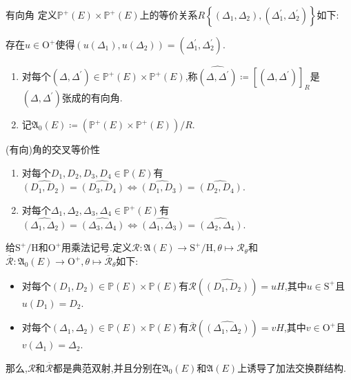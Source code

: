\begin{definition}{有向角}{}
	定义$\mathbb{P}^{+}\left(E\right)\times\mathbb{P}^{+}\left(E\right)$上的等价关系$R\left\{\left(\Delta_{1},\Delta_{2}\right),\left(\Delta_{1}^{\prime},\Delta_{2}^{\prime}\right)\right\}$如下:
	\begin{center}
		存在$u\in\mathrm{O}^{+}$使得$\left(u\left(\Delta_{1}\right),u\left(\Delta_{2}\right)\right)=\left(\Delta_{1}^{\prime},\Delta_{2}^{\prime}\right)$.
	\end{center}
	\begin{enumerate}
		\item 对每个$\left(\Delta,\Delta^{\prime}\right)\in\mathbb{P}^{+}\left(E\right)\times\mathbb{P}^{+}\left(E\right)$,称$\widehat{\left(\Delta,\Delta^{\prime}\right)}\coloneq\left[\left(\Delta,\Delta^{\prime}\right)\right]_{R}$是$\left(\Delta,\Delta^{\prime}\right)$张成的有向角.
		\item 记$\mathfrak{A}_{0}\left(E\right)\coloneq\left(\mathbb{P}^{+}\left(E\right)\times\mathbb{P}^{+}\left(E\right)\right)/R$.
	\end{enumerate}
\end{definition}

\begin{proposition}{(有向)角的交叉等价性}{}
	\begin{enumerate}
		\item 对每个$D_{1},D_{2},D_{3},D_{4}\in\mathbb{P}\left(E\right)$有$\widehat{\left(D_{1},D_{2}\right)}=\widehat{\left(D_{3},D_{4}\right)}\iff\widehat{\left(D_{1},D_{3}\right)}=\widehat{\left(D_{2},D_{4}\right)}$.
		\item 对每个$\Delta_{1},\Delta_{2},\Delta_{3},\Delta_{4}\in\mathbb{P}^{+}\left(E\right)$有$\widehat{\left(\Delta_{1},\Delta_{2}\right)}=\widehat{\left(\Delta_{3},\Delta_{4}\right)}\iff\widehat{\left(\Delta_{1},\Delta_{3}\right)}=\widehat{\left(\Delta_{2},\Delta_{4}\right)}$.
	\end{enumerate}
\end{proposition}

\begin{proposition}{}{}
	给$\mathrm{S}^{+}/\mathrm{H}$和$\mathrm{O}^{+}$用乘法记号.定义$\mathcal{R}:\mathfrak{A}\left(E\right)\to\mathrm{S}^{+}/\mathrm{H},\theta\mapsto\mathcal{R}_{\theta}$和$\overline{\mathcal{R}}:\mathfrak{A}_{0}\left(E\right)\to\mathrm{O}^{+},\theta\mapsto\overline{\mathcal{R}}_{\theta}$如下:
	\begin{itemize}
		\item 对每个$\left(D_{1},D_{2}\right)\in\mathbb{P}\left(E\right)\times\mathbb{P}\left(E\right)$有$\mathcal{R}\left(\widehat{\left(D_{1},D_{2}\right)}\right)=uH$,其中$u\in\mathrm{S}^{+}$且$u\left(D_{1}\right)=D_{2}$.
		\item 对每个$\left(\Delta_{1},\Delta_{2}\right)\in\mathbb{P}\left(E\right)\times\mathbb{P}\left(E\right)$有$\overline{\mathcal{R}}\left(\widehat{\left(\Delta_{1},\Delta_{2}\right)}\right)=vH$,其中$v\in\mathrm{O}^{+}$且$v\left(\Delta_{1}\right)=\Delta_{2}$.
	\end{itemize}
	那么,$\mathcal{R}$和$\overline{\mathcal{R}}$都是典范双射,并且分别在$\mathfrak{A}_{0}\left(E\right)$和$\mathfrak{A}\left(E\right)$上诱导了加法交换群结构.
\end{proposition}

